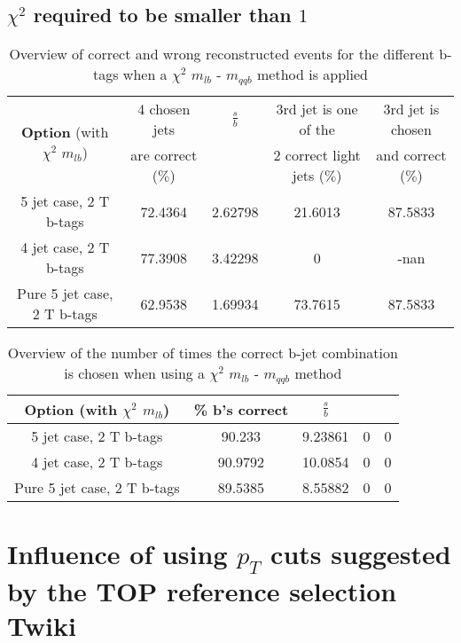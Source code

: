 \documentclass[a4paper,12pt]{report}
\begin{document}
\subsection{$\chi^{2}$ required to be smaller than $1$}
 \begin{table}[!h] 
 \begin{tabular}{c|c|c|c|c} 
\multirow{2}{*}{\textbf{Option} (with $\chi^{2}$ $m_{lb}$)} & 4 chosen jets & $\frac{s}{b}$ & 3rd jet is one of the & 3rd jet is chosen \\ & are correct ($\%$)    & 	             & 2 correct light jets ($\%$) &  and correct ($\%$)	  \\ \hline 
 5 jet case,      2 T b-tags              & 72.4364 & 2.62798 & 21.6013 & 87.5833 \\ 
 4 jet case,      2 T b-tags              & 77.3908 & 3.42298 & 0 & -nan \\ 
 Pure 5 jet case, 2 T b-tags              & 62.9538 & 1.69934 & 73.7615 & 87.5833 \\ 
 \end{tabular} 
 \caption{Overview of correct and wrong reconstructed events for the different b-tags when a $\chi^{2}$ $m_{lb}$ - $m_{qqb}$ method is applied} 
 \end{table} 
 
 \begin{table}[!h] 
 \begin{tabular}{c|c|c|c|c} 
 \textbf{Option} (with $\chi^{2}$ $m_{lb}$) & \% b's correct   & $\frac{s}{b}$ &  &  \\ \hline 
 5 jet case,      2 T b-tags              & 90.233 & 9.23861 & 0 & 0 \\ 
 4 jet case,      2 T b-tags              & 90.9792 & 10.0854 & 0 & 0 \\ 
 Pure 5 jet case, 2 T b-tags              & 89.5385 & 8.55882 & 0 & 0 \\ 
 \end{tabular} 
 \caption{Overview of the number of times the correct b-jet combination is chosen when using a $\chi^{2}$ $m_{lb}$ - $m_{qqb}$ method} 
 \end{table} 

\section{Influence of using $p_T$ cuts suggested by the TOP reference selection Twiki}
\end{document}
